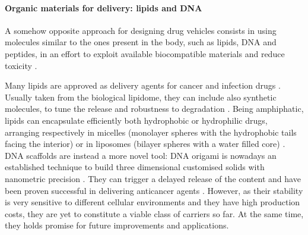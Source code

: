 \paragraph{Organic materials for delivery: lipids and DNA} \label{sec:organic}

A somehow opposite approach for designing drug vehicles consists in using molecules similar to the ones present in the body, such as lipids, DNA and peptides, in an effort to exploit available biocompatible materials and reduce toxicity \citep{Yoo2011}.

Many lipids are approved as delivery agents for cancer and infection drugs \citep{Pattni2015paper, Jain2017}. Usually taken from the biological lipidome, they can include also synthetic molecules, to tune the release and robustness to degradation \citep{Yingchoncharoen2016}.
%
Being amphiphatic, lipids can encapsulate efficiently both hydrophobic or hydrophilic drugs, arranging respectively in micelles (monolayer spheres with the hydrophobic tails facing the interior) or in liposomes (bilayer spheres with a water filled core) \citep{Bunker2016}.
%
DNA scaffolds are instead a more novel tool: DNA origami is nowadays an established technique to build three dimensional customised solids with nanometric precision \citep{Linko2015}. They can trigger a delayed release of the content \citep{Douglas2012} and have been proven successful in delivering anticancer agents \citep{Zhang2014, Jiang2012}. However, as their stability is very sensitive to different cellular environments and they have high production costs, they are yet to constitute a viable class of carriers so far. At the same time, they holds promise for future improvements and applications.

